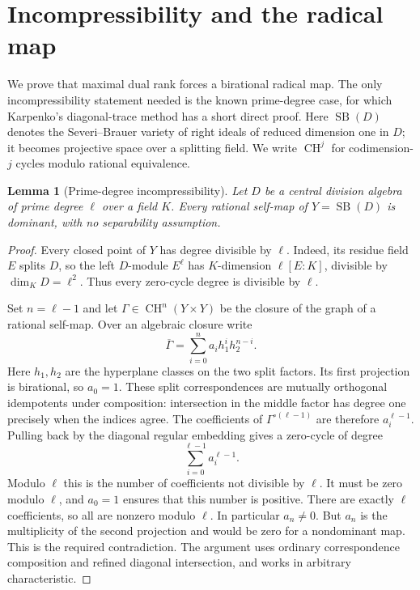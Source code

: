 \documentclass[11pt]{article}
\newtheorem{lemma}[theorem]{Lemma}
\theoremstyle{definition}\newtheorem{definition}[theorem]{Definition}
\theoremstyle{remark}\newtheorem{remark}[theorem]{Remark}
\newcommand{\CH}{\operatorname{CH}}
\newcommand{\SB}{\operatorname{SB}}
\begin{document}
\section{Incompressibility and the radical map}\label{sec:dominance}

We prove that maximal dual rank forces a birational radical map. The only incompressibility statement needed is the known prime-degree case, for which Karpenko's diagonal-trace method has a short direct proof. Here $\SB(D)$ denotes the Severi--Brauer variety of right ideals of reduced dimension one in $D$; it becomes projective space over a splitting field. We write $\CH^j$ for codimension-$j$ cycles modulo rational equivalence.

\begin{lemma}[Prime-degree incompressibility]\label{lem:incompressible}
Let $D$ be a central division algebra of prime degree $\ell$ over a field $K$. Every rational self-map of $Y=\SB(D)$ is dominant, with no separability assumption.
\end{lemma}
\begin{proof}
Every closed point of $Y$ has degree divisible by $\ell$. Indeed, its residue field $E$ splits $D$, so the left $D$-module $E^\ell$ has $K$-dimension $\ell[E:K]$, divisible by $\dim_KD=\ell^2$. Thus every zero-cycle degree is divisible by $\ell$.

Set $n=\ell-1$ and let $\Gamma\in\CH^n(Y\times Y)$ be the closure of the graph of a rational self-map. Over an algebraic closure write
\[
 \overline\Gamma=\sum_{i=0}^n a_i h_1^i h_2^{n-i}.
\]
Here $h_1,h_2$ are the hyperplane classes on the two split factors. Its first projection is birational, so $a_0=1$. These split correspondences are mutually orthogonal idempotents under composition: intersection in the middle factor has degree one precisely when the indices agree. The coefficients of $\Gamma^{\circ(\ell-1)}$ are therefore $a_i^{\ell-1}$. Pulling back by the diagonal regular embedding gives a zero-cycle of degree
\[
 \sum_{i=0}^{\ell-1}a_i^{\ell-1}.
\]
Modulo $\ell$ this is the number of coefficients not divisible by $\ell$. It must be zero modulo $\ell$, and $a_0=1$ ensures that this number is positive. There are exactly $\ell$ coefficients, so all are nonzero modulo $\ell$. In particular $a_n\ne0$. But $a_n$ is the multiplicity of the second projection and would be zero for a nondominant map. This is the required contradiction. The argument uses ordinary correspondence composition and refined diagonal intersection, and works in arbitrary characteristic.
\end{proof}
\end{document}
